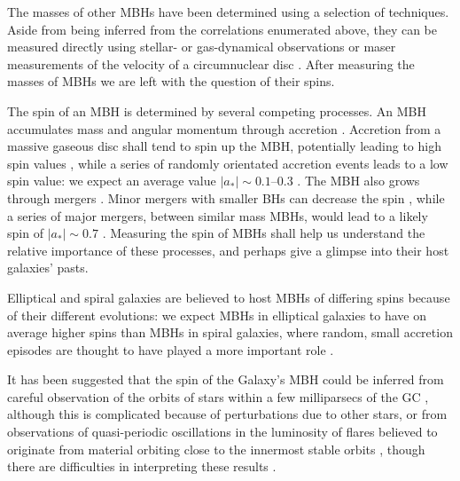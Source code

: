 The masses of other MBHs have been determined using a selection of techniques. Aside from being inferred from the correlations enumerated above, they can be measured directly using stellar- or gas-dynamical observations \citep[e.g.,][]{Macchetto1997,vanderMarel1998,Gebhardt2003} or maser measurements of the velocity of a circumnuclear disc \citep[e.g.,][]{Miyoshi1995}. After measuring the masses of MBHs we are left with the question of their spins.

The spin of an MBH is determined by several competing processes. An MBH accumulates mass and angular momentum through accretion \citep{Volonteri2010,King2013}. Accretion from a massive gaseous disc shall tend to spin up the MBH, potentially leading to high spin values \citep{Volonteri2005}, while a series of randomly orientated accretion events leads to a low spin value: we expect an average value $|a_\ast| \sim 0.1$--$0.3$ \citep{King2006, King2008}. The MBH also grows through mergers \citep{Yu2002, Malbon2007}. Minor mergers with smaller BHs can decrease the spin \citep{Hughes2003, Gammie2004}, while a series of major mergers, between similar mass MBHs, would lead to a likely spin of $|a_\ast| \sim 0.7$ \citep{Gonzalez2007, Berti2007, Berti2008}. Measuring the spin of MBHs shall help us understand the relative importance of these processes, and perhaps give a glimpse into their host galaxies' pasts.

Elliptical and spiral galaxies are believed to host MBHs of differing spins because of their different evolutions: we expect MBHs in elliptical galaxies to have on average higher spins than MBHs in spiral galaxies, where random, small accretion episodes are thought to have played a more important role \citep{Volonteri2007, Sikora2007}.

It has been suggested that the spin of the Galaxy's MBH could be inferred from careful observation of the orbits of stars within a few milliparsecs of the GC \citep{Merritt2010}, although this is complicated because of perturbations due to other stars, or from observations of quasi-periodic oscillations in the luminosity of flares believed to originate from material orbiting close to the innermost stable orbits \citep{Genzel2003a, Belanger2006, Trippe2007, Hamaus2009, Kato2010}, though there are difficulties in interpreting these results \citep{Psaltis2008a}.



